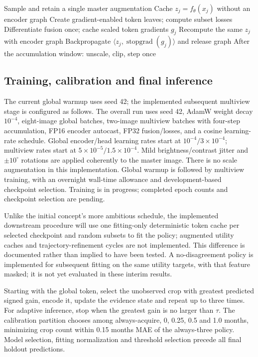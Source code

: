 \documentclass[nolineno]{ieeeaccess}
\newcommand{\sg}{\operatorname{stopgrad}}
\begin{document}
\begin{algorithm}[!t]\caption{One multiview replay update}\label{alg:replay}
\begin{algorithmic}[1]
\State Sample and retain a single master augmentation
\State Cache $z_j=f_\theta(x_j)$ without an encoder graph
\EndFor
\State Create gradient-enabled token leaves; compute subset losses
\State Differentiate fusion once; cache scaled token gradients $g_j$
\State Recompute the same $z_j$ with encoder graph
\State Backpropagate $\langle z_j,\sg(g_j)\rangle$ and release graph
\EndFor
\State After the accumulation window: unscale, clip, step once
\end{algorithmic}\end{algorithm}

\subsection{Training, calibration and final inference}
The current global warmup uses seed 42; the implemented subsequent multiview stage is configured as follows. The overall run uses seed 42, AdamW weight decay $10^{-4}$, eight-image global batches, two-image multiview batches with four-step accumulation, FP16 encoder autocast, FP32 fusion/losses, and a cosine learning-rate schedule. Global encoder/head learning rates start at $10^{-4}/3\times10^{-4}$; multiview rates start at $5\times10^{-5}/1.5\times10^{-4}$. Mild brightness/contrast jitter and $\pm10^\circ$ rotations are applied coherently to the master image. There is no scale augmentation in this implementation. Global warmup is followed by multiview training, with an overnight wall-time allowance and development-based checkpoint selection. Training is in progress; completed epoch counts and checkpoint selection are pending.

Unlike the initial concept's more ambitious schedule, the implemented downstream procedure will use one fitting-only deterministic token cache per selected checkpoint and random subsets to fit the policy; augmented utility caches and trajectory-refinement cycles are not implemented. This difference is documented rather than implied to have been tested. A no-disagreement policy is implemented for subsequent fitting on the same utility targets, with that feature masked; it is not yet evaluated in these interim results.

Starting with the global token, select the unobserved crop with greatest predicted signed gain, encode it, update the evidence state and repeat up to three times. For adaptive inference, stop when the greatest gain is no larger than $\tau$. The calibration partition chooses among always-acquire, 0, 0.25, 0.5 and 1.0 months, minimizing crop count within 0.15 months MAE of the always-three policy. Model selection, fitting normalization and threshold selection precede all final holdout predictions.
\end{document}
